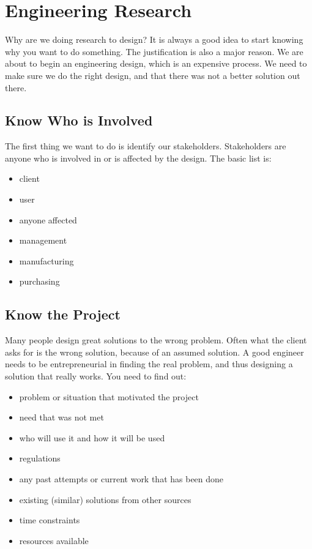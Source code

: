 %

\chapter{Engineering Research}

Why are we doing research to design?  It is always a good idea to start knowing why you want to do something.  The justification is also a major reason.  We are about to begin an engineering design, which is an expensive process.  We need to make sure we do the right design, and that there was not a better solution out there.

\section{Know Who is Involved}

The first thing we want to do is identify our stakeholders.  Stakeholders are anyone who is involved in or is affected by the design. The basic list is:
\begin{itemize}
\item client
\item user
\item anyone affected
\item management
\item manufacturing
\item purchasing
\end{itemize}

\section{Know the Project}

Many people design great solutions to the wrong problem.  Often what the client asks for is the wrong solution, because of an assumed solution.  A good engineer needs to be entrepreneurial in finding the real problem, and thus designing a solution that really works. You need to find out:
\begin{itemize}
\item problem or situation that motivated the project
\item need that was not met
\item who will use it and how it will be used
\item regulations
\item any past attempts or current work that has been done 
\item existing (similar) solutions from other sources
\item time constraints
\item resources available
\end{itemize}

